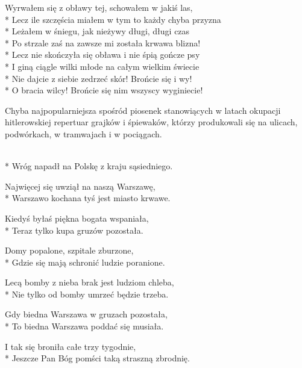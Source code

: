 \begin{lyrics}[longestline={Bo z trzema na raz walczy psami i trzech ran na raz krwawi.}]
\chorusref

Wyrwałem się z obławy tej, schowałem w jakiś las,\\*
Lecz ile szczęścia miałem w tym to każdy chyba przyzna\\*
Leżałem w śniegu, jak nieżywy długi, długi czas\\*
Po strzale zaś na zawsze mi została krwawa blizna!\\*
Lecz nie skończyła się obława i nie śpią gończe psy\\*
I giną ciągle wilki młode na całym wielkim świecie\\*
Nie dajcie z siebie zedrzeć skór! Brońcie się i wy!\\*
O bracia wilcy! Brońcie się nim wszyscy wyginiecie!

\chorusref
\end{lyrics}



\begin{info}Chyba najpopularniejsza spośród piosenek stanowiących w latach okupacji hitlerowskiej repertuar grajków i śpiewaków, którzy produkowali się na ulicach, podwórkach, w tramwajach i w pociągach. \end{info}

\begin{lyrics}[longestline={Jeszcze Pan Bóg pomści taką straszną zbrodnię.}]

\\*
Wróg napadł na Polskę z kraju sąsiedniego.

Najwięcej się uwziął na naszą Warszawę,\\*
Warszawo kochana tyś jest miasto krwawe.

Kiedyś byłaś piękna bogata wspaniała,\\*
Teraz tylko kupa gruzów pozostała.

Domy popalone, szpitale zburzone,\\*
Gdzie się mają schronić ludzie poranione.

Lecą bomby z nieba brak jest ludziom chleba,\\*
Nie tylko od bomby umrzeć będzie trzeba.

Gdy biedna Warszawa w gruzach pozostała,\\*
To biedna Warszawa poddać się musiała.

I tak się broniła całe trzy tygodnie,\\*
Jeszcze Pan Bóg pomści taką straszną zbrodnię.
\end{lyrics}



